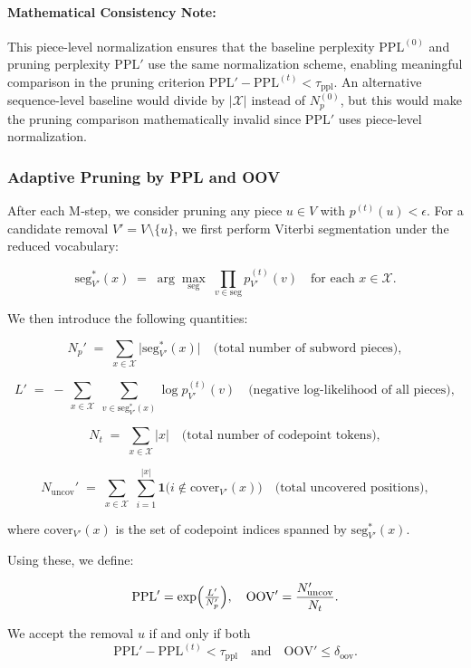 \paragraph{Mathematical Consistency Note:} 
This piece-level normalization ensures that the baseline perplexity \(\mathrm{PPL}^{(0)}\) and pruning perplexity \(\mathrm{PPL}'\) use the same normalization scheme, enabling meaningful comparison in the pruning criterion \(\mathrm{PPL}' - \mathrm{PPL}^{(t)} < \tau_{\mathrm{ppl}}\). An alternative sequence-level baseline would divide by \(|\mathcal X|\) instead of \(N_{p}^{(0)}\), but this would make the pruning comparison mathematically invalid since \(\mathrm{PPL}'\) uses piece-level normalization.

\subsubsection{Adaptive Pruning by PPL and OOV}

After each M‐step, we consider pruning any piece \(u\in V\) with \(p^{(t)}(u)<\epsilon\).  For a candidate removal \(V' = V \setminus \{u\}\), we first perform Viterbi segmentation under the reduced vocabulary:

\[
\mathrm{seg}^{*}_{V'}(x) \;=\;\arg\max_{\mathrm{seg}} \;\prod_{v\in\mathrm{seg}} p^{(t)}_{V'}(v)
\quad\text{for each }x\in\mathcal X.
\]

We then introduce the following quantities:

\[
N_{p}' \;=\;\sum_{x\in\mathcal X} \bigl|\mathrm{seg}^{*}_{V'}(x)\bigr|
\quad\text{(total number of subword pieces)},
\]

\[
L' \;=\; -\,\sum_{x\in\mathcal X}\;\sum_{v\in\mathrm{seg}^{*}_{V'}(x)}\log p^{(t)}_{V'}(v)
\quad\text{(negative log‐likelihood of all pieces)},
\]

\[
N_{t} \;=\;\sum_{x\in\mathcal X} |x|
\quad\text{(total number of codepoint tokens)},
\]

\[
N_{\mathrm{uncov}}' 
\;=\; \sum_{x\in\mathcal X}\;\sum_{i=1}^{|x|}
\mathbf1\bigl(i\not\in \mathrm{cover}_{V'}(x)\bigr)
\quad\text{(total uncovered positions)},
\]

where \(\mathrm{cover}_{V'}(x)\) is the set of codepoint indices spanned by \(\mathrm{seg}^{*}_{V'}(x)\).

Using these, we define:

\[
\mathrm{PPL}' 
= \exp\Bigl(\tfrac{L'}{N_{p}'}\Bigr),
\quad
\mathrm{OOV}' 
= \frac{N_{\mathrm{uncov}}'}{N_{t}}.
\]

We accept the removal \(u\) if and only if both
\[
\mathrm{PPL}' - \mathrm{PPL}^{(t)} < \tau_{\mathrm{ppl}}
\quad\text{and}\quad
\mathrm{OOV}' \le \delta_{\mathrm{oov}}.
\]

